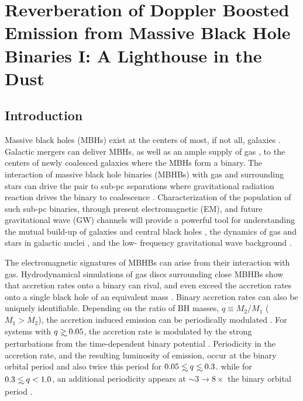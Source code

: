 \chapter[A Lighthouse in the Dust]{Reverberation of Doppler Boosted Emission from Massive Black Hole Binaries I: A Lighthouse in the Dust}
\label{ch:Dust}
\let\thefootnote\relax{}





\section{Introduction} 
Massive black holes (MBHs) exist at the centers of
most, if not all, galaxies \citep{kr95, KormendyHo2013}. Galactic mergers can
deliver MBHs, as well as an ample supply of gas \citep{BH1992, Barnes:1996,
Barnes:2002, Mayer:2013:MBHBGasRev}, to the centers of newly coalesced
galaxies where the MBHs form a binary. The interaction of massive black hole
binaries (MBHBs) with gas and surrounding stars can drive the pair to sub-pc
separations where gravitational radiation reaction drives the binary to
coalescence \citep{Begel:Blan:Rees:1980}.  Characterization of the population
of such sub-pc binaries, through present electromagnetic (EM), and future
gravitational wave (GW) channels will provide a powerful tool for
understanding the mutual build-up of galaxies and central black holes
\citep[\textit{e.g.}][]{KormendyHo2013}, the dynamics of gas and stars in
galactic nuclei \citep[\textit{e.g.}][]{MerrittMilos:2005:LRR}, and the low-
frequency gravitational wave background
\citep[\textit{e.g.}][]{KocsisSesana:2011, Shannon:2015,
Arzoumanian:2015:SGWB}.

The electromagnetic signatures of MBHBs can arise from their interaction with
gas. Hydrodynamical simulations of gas discs surrounding close MBHBs show that
accretion rates onto a binary can rival, and even exceed the accretion rates
onto a single black hole of an equivalent mass \citep{ShiKrolik:2012,
DHM:2013:MNRAS, Farris:2014, ShiKrolik:2015, MunozLai:2016}. Binary accretion
rates can also be uniquely identifiable. Depending on the ratio of BH masses,
$q \equiv M_2/M_1$ ($M_1>M_2$), the accretion induced emission can be
periodically modulated \citep{Farris:2015:Cool}. For systems with $q \gsim
0.05$, the accretion rate is modulated by the strong perturbations from the
time-dependent binary potential \citep{D'Orazio:CBDTrans:2016}. Periodicity in
the accretion rate, and the resulting luminosity of emission, occur at the
binary orbital period and also twice this period for $0.05 \lsim q \lsim 0.3$.
while for $0.3 \lsim q < 1.0$, an additional periodicity appears at $\sim3
\rightarrow 8\times$ the binary orbital period \citep{ShiKrolik:2012,
DHM:2013:MNRAS, Farris:2014, ShiKrolik:2015, MunozLai:2016}.

